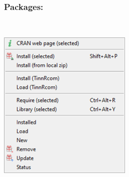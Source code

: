 \hypertarget{menu_r_control_packages}{}
\subsubsection{Packages:}\\

\includegraphics[scale=0.50]{./res/menu_r_control_packages.png}\\

